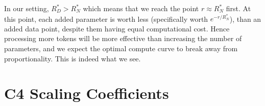 \documentclass{article}
\begin{document}
In our setting, $R^*_D > R^*_N$ which means that we reach the point $r \approx R^*_N$ first. 
At this point, each added parameter is worth less (specifically worth $e^{-r/R^*_N}$), than an added data point, despite them having equal computational cost.
Hence processing more tokens will be more effective than increasing the number of parameters, and we expect the optimal compute curve to break away from proportionality.
This is indeed what we see.

\FloatBarrier

\section{C4 Scaling Coefficients}
\label{sec:c4scaling}
\end{document}
